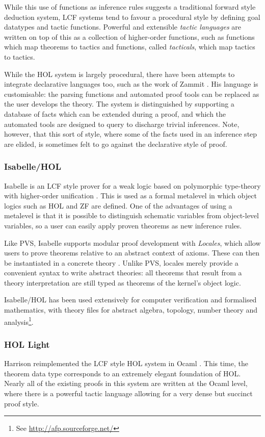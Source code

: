 While this use of functions as inference rules suggests a traditional forward style deduction system, LCF systems tend to favour a procedural style by defining goal datatypes and tactic functions. Powerful and extensible \emph{tactic languages} are written on top of this as a collection of higher-order functions, such as functions which map theorems to tactics and functions, called \emph{tacticals}, which map tactics to tactics. 

While the HOL system is largely procedural, there have been attempts to integrate declarative languages too, such as the work of Zammit \cite{ZammitDeclarative}. His language is customisable: the parsing functions and automated proof tools can be replaced as the user develops the theory. The system is distinguished by supporting a database of facts which can be extended during a proof, and which the automated tools are designed to query to discharge trivial inferences. Note, however, that this sort of style, where some of the facts used in an inference step are elided, is sometimes felt to go against the declarative style of proof\label{ZammitNotDeclarative}.

\subsubsection{Isabelle/HOL}
Isabelle is an LCF style prover for a weak logic based on polymorphic type-theory with higher-order unification \cite{Isabelle, IsabelleTypeClasses}. This is used as a formal metalevel in which object logics such as HOL and ZF are defined. One of the advantages of using a metalevel is that it is possible to distinguish schematic variables from object-level variables, so a user can easily apply proven theorems as new inference rules. 

Like PVS, Isabelle supports modular proof development with \emph{Locales}, which allow users to prove theorems relative to an abstract context of axioms. These can then be instantiated in a concrete theory \cite{IsabelleLocales}. Unlike PVS, locales merely provide a convenient syntax to write abstract theories: all theorems that result from a theory interpretation are still typed as theorems of the kernel's object logic. 

Isabelle/HOL has been used extensively for computer verification and formalised mathematics, with theory files for abstract algebra, topology, number theory and analysis\footnote{See \url{http://afp.sourceforge.net/}}.

\subsubsection{HOL Light}
Harrison reimplemented the LCF style HOL system in Ocaml \cite{HOLLight}. This time, the theorem data type corresponds to an extremely elegant foundation of HOL. Nearly all of the existing proofs in this system are written at the Ocaml level, where there is a powerful tactic language allowing for a very dense but succinct proof style. 

